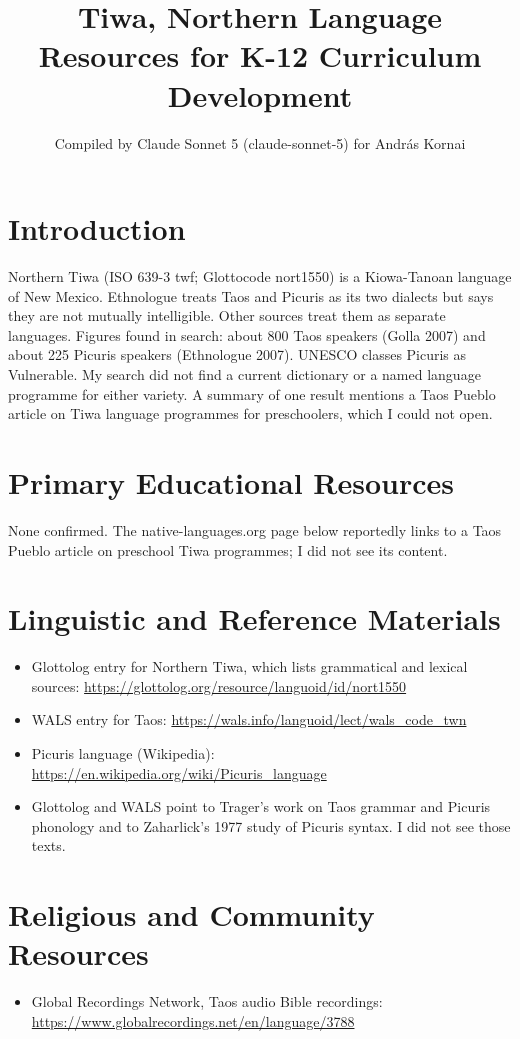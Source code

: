 \documentclass[12pt]{article}
\title{Tiwa, Northern Language Resources for K-12 Curriculum Development}
\author{Compiled by Claude Sonnet 5 (claude-sonnet-5) for Andr\'as Kornai}
\date{}
\begin{document}
\maketitle

\section{Introduction}
Northern Tiwa (ISO 639-3 twf; Glottocode nort1550) is a Kiowa-Tanoan language of New Mexico. Ethnologue treats Taos and Picuris as its two dialects but says they are not mutually intelligible. Other sources treat them as separate languages. Figures found in search: about 800 Taos speakers (Golla 2007) and about 225 Picuris speakers (Ethnologue 2007). UNESCO classes Picuris as Vulnerable. My search did not find a current dictionary or a named language programme for either variety. A summary of one result mentions a Taos Pueblo article on Tiwa language programmes for preschoolers, which I could not open.

\section{Primary Educational Resources}
None confirmed. The native-languages.org page below reportedly links to a Taos Pueblo article on preschool Tiwa programmes; I did not see its content.

\section{Linguistic and Reference Materials}
\begin{itemize}
\item Glottolog entry for Northern Tiwa, which lists grammatical and lexical sources: \url{https://glottolog.org/resource/languoid/id/nort1550}
\item WALS entry for Taos: \url{https://wals.info/languoid/lect/wals_code_twn}
\item Picuris language (Wikipedia): \url{https://en.wikipedia.org/wiki/Picuris_language}
\item Glottolog and WALS point to Trager's work on Taos grammar and Picuris phonology and to Zaharlick's 1977 study of Picuris syntax. I did not see those texts.
\end{itemize}

\section{Religious and Community Resources}
\begin{itemize}
\item Global Recordings Network, Taos audio Bible recordings: \url{https://www.globalrecordings.net/en/language/3788}
\end{itemize}
\end{document}
